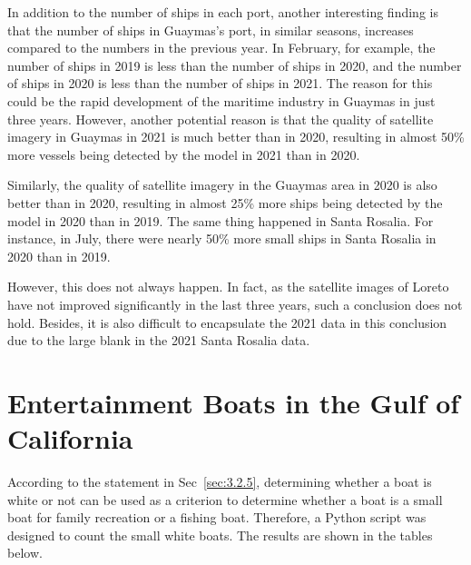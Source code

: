 In addition to the number of ships in each port, another interesting finding is that the number of ships in Guaymas's port, in similar seasons, increases compared to the numbers in the previous year. In February, for example, the number of ships in 2019 is less than the number of ships in 2020, and the number of ships in 2020 is less than the number of ships in 2021. The reason for this could be the rapid development of the maritime industry in Guaymas in just three years. However, another potential reason is that the quality of satellite imagery in Guaymas in 2021 is much better than in 2020, resulting in almost 50\% more vessels being detected by the model in 2021 than in 2020.

Similarly, the quality of satellite imagery in the Guaymas area in 2020 is also better than in 2020, resulting in almost 25\% more ships being detected by the model in 2020 than in 2019. The same thing happened in Santa Rosalia. For instance, in July, there were nearly 50\% more small ships in Santa Rosalia in 2020 than in 2019.

However, this does not always happen. In fact, as the satellite images of Loreto have not improved significantly in the last three years, such a conclusion does not hold. Besides, it is also difficult to encapsulate the 2021 data in this conclusion due to the large blank in the 2021 Santa Rosalia data.



\section{Entertainment Boats in the Gulf of California}
According to the statement in Sec~\ref{sec:3.2.5}, determining whether a boat is white or not can be used as a criterion to determine whether a boat is a small boat for family recreation or a fishing boat. Therefore, a Python script was designed to count the small white boats. The results are shown in the tables below.\\


